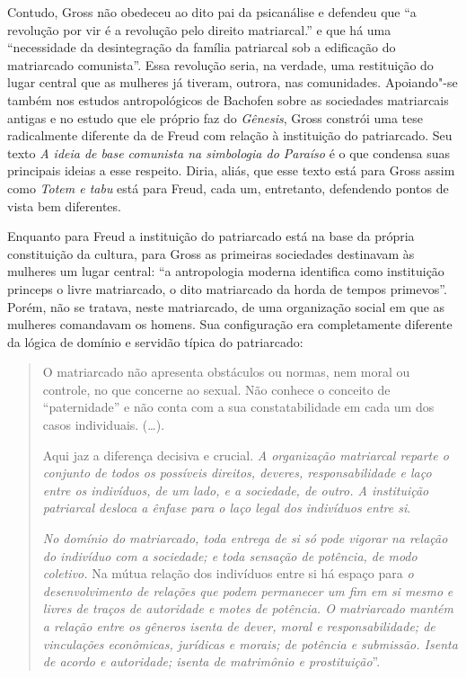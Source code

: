 Contudo, Gross não obedeceu ao dito pai da psicanálise e defendeu que
``a revolução por vir é a revolução pelo direito matriarcal.'' e que há
uma ``necessidade da desintegração da família patriarcal sob a
edificação do matriarcado comunista''. Essa revolução seria, na
verdade, uma restituição do lugar central que as mulheres já tiveram,
outrora, nas comunidades. Apoiando"-se também nos estudos antropológicos
de Bachofen sobre as sociedades matriarcais antigas e no estudo que ele
próprio faz do \emph{Gênesis}, Gross constrói uma tese radicalmente
diferente da de Freud com relação à instituição do patriarcado. Seu
texto \emph{A ideia de base comunista na simbologia do Paraíso} é o que
condensa suas principais ideias a esse respeito. Diria, aliás, que esse
texto está para Gross assim como \emph{Totem e tabu} está para Freud,
cada um, entretanto, defendendo pontos de vista bem diferentes.

Enquanto para Freud a instituição do patriarcado está na base da própria
constituição da cultura, para Gross as primeiras sociedades destinavam
às mulheres um lugar central: ``a antropologia moderna identifica como
instituição princeps o livre matriarcado, o dito matriarcado da horda de
tempos primevos''. Porém, não se tratava, neste matriarcado, de uma
organização social em que as mulheres comandavam os homens. Sua
configuração era completamente diferente da lógica de domínio e servidão
típica do patriarcado:

\begin{quote}
O matriarcado não apresenta obstáculos ou normas, nem moral ou controle,
no que concerne ao sexual. Não conhece o conceito de ``paternidade'' e
não conta com a sua constatabilidade em cada um dos casos individuais.
(\ldots{}).

Aqui jaz a diferença decisiva e crucial. \emph{A organização matriarcal
reparte o conjunto de todos os possíveis direitos, deveres,
responsabilidade e laço entre os indivíduos, de um lado, e a sociedade,
de outro. A instituição patriarcal desloca a ênfase para o laço legal
dos indivíduos entre si}.

\emph{No domínio do matriarcado, toda entrega de si só pode vigorar na
relação do indivíduo com a sociedade; e toda sensação de potência, de
modo coletivo.} Na mútua relação dos indivíduos entre si há espaço para
\emph{o desenvolvimento de relações que podem permanecer um fim em si
mesmo} \emph{e livres de traços de autoridade e motes de potência. O
matriarcado mantém a relação entre os gêneros isenta de dever, moral e
responsabilidade; de vinculações econômicas, jurídicas e morais; de
potência e submissão. Isenta de acordo e autoridade; isenta de
matrimônio e prostituição}''.
\end{quote}

